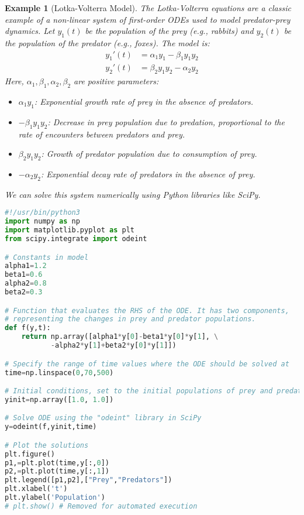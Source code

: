 \documentclass{article}
\newtheorem{example}{Example}
\begin{document}
\begin{example}[Lotka-Volterra Model]
The Lotka-Volterra equations are a classic example of a non-linear system of first-order ODEs used to model predator-prey dynamics. Let $y_1(t)$ be the population of the prey (e.g., rabbits) and $y_2(t)$ be the population of the predator (e.g., foxes). The model is:
\begin{align*}
y_1'(t) &= \alpha_1 y_1 - \beta_1 y_1 y_2 \\
y_2'(t) &= \beta_2 y_1 y_2 - \alpha_2 y_2
\end{align*}
Here, $\alpha_1, \beta_1, \alpha_2, \beta_2$ are positive parameters:
\begin{itemize}
    \item $\alpha_1 y_1$: Exponential growth rate of prey in the absence of predators.
    \item $-\beta_1 y_1 y_2$: Decrease in prey population due to predation, proportional to the rate of encounters between predators and prey.
    \item $\beta_2 y_1 y_2$: Growth of predator population due to consumption of prey.
    \item $-\alpha_2 y_2$: Exponential decay rate of predators in the absence of prey.
\end{itemize}
We can solve this system numerically using Python libraries like SciPy.

\begin{lstlisting}[language=Python, breaklines=true, caption={Python code (\texttt{l\_v.py}) for solving the Lotka-Volterra equations using \texttt{scipy.integrate.odeint}.}, label=lst:lotka_volterra]
#!/usr/bin/python3
import numpy as np
import matplotlib.pyplot as plt
from scipy.integrate import odeint

# Constants in model
alpha1=1.2
beta1=0.6
alpha2=0.8
beta2=0.3

# Function that evaluates the RHS of the ODE. It has two components,
# representing the changes in prey and predator populations.
def f(y,t):
    return np.array([alpha1*y[0]-beta1*y[0]*y[1], \
           -alpha2*y[1]+beta2*y[0]*y[1]])

# Specify the range of time values where the ODE should be solved at
time=np.linspace(0,70,500)

# Initial conditions, set to the initial populations of prey and predators
yinit=np.array([1.0, 1.0])

# Solve ODE using the "odeint" library in SciPy
y=odeint(f,yinit,time)

# Plot the solutions
plt.figure()
p1,=plt.plot(time,y[:,0])
p2,=plt.plot(time,y[:,1])
plt.legend([p1,p2],["Prey","Predators"])
plt.xlabel('t')
plt.ylabel('Population')
# plt.show() # Removed for automated execution
\end{lstlisting}


\end{example}
\end{document}
